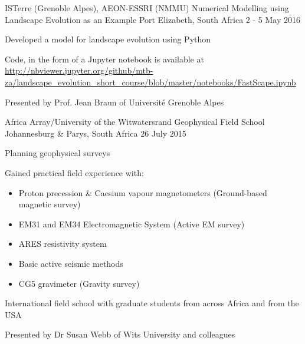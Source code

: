 


\begin{cventries}


\cventry
{ISTerre (Grenoble Alpes), AEON-ESSRI (NMMU)} %
{Numerical Modelling using Landscape Evolution as an Example} %
{Port Elizabeth, South Africa} %
{2 - 5 May 2016} %
{ %
\begin{cvitems}
\item {Developed a model for landscape evolution using Python}
\item {Code, in the form of a Jupyter notebook is available at \url{http://nbviewer.jupyter.org/github/mtb-za/landscape_evolution_short_course/blob/master/notebooks/FastScape.ipynb}}
\item {Presented by Prof. Jean Braun of Universit\'{e} Grenoble Alpes}
\end{cvitems}
}


\cventry
{Africa Array/University of the Witwatersrand} %
{Geophysical Field School} %
{Johannesburg \& Parys, South Africa} %
{26 July 2015} %
{ %
\begin{cvitems}
\item {Planning geophysical surveys}
\item {Gained practical field experience with:
\begin{itemize}
\item {Proton precession \& Caesium vapour magnetometers (Ground-based magnetic survey)}
\item {EM31 and EM34 Electromagnetic System (Active EM survey)}
\item {ARES resistivity system}
\item {Basic active seismic methods}
\item {CG5 gravimeter (Gravity survey)}
\end{itemize}
}
\item {International field school with graduate students from across Africa and from the USA}
\item {Presented by Dr Susan Webb of Wits University and colleagues}
\end{cvitems}
}


\end{cventries}
